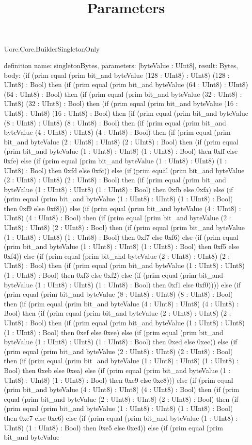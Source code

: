 \begin{lexlean}{Uorc.Core.BuilderSingletonOnly}
\title{Parameters}
\begin{semanticmodule}
definition{
  name: singletonBytes,
  parameters: [byteValue : UInt8],
  result: Bytes,
  body: (if (prim equal (prim bit_and byteValue (128 : UInt8) : UInt8) (128 : UInt8) : Bool) then (if (prim equal (prim bit_and byteValue (64 : UInt8) : UInt8) (64 : UInt8) : Bool) then (if (prim equal (prim bit_and byteValue (32 : UInt8) : UInt8) (32 : UInt8) : Bool) then (if (prim equal (prim bit_and byteValue (16 : UInt8) : UInt8) (16 : UInt8) : Bool) then (if (prim equal (prim bit_and byteValue (8 : UInt8) : UInt8) (8 : UInt8) : Bool) then (if (prim equal (prim bit_and byteValue (4 : UInt8) : UInt8) (4 : UInt8) : Bool) then (if (prim equal (prim bit_and byteValue (2 : UInt8) : UInt8) (2 : UInt8) : Bool) then (if (prim equal (prim bit_and byteValue (1 : UInt8) : UInt8) (1 : UInt8) : Bool) then 0xff else 0xfe) else (if (prim equal (prim bit_and byteValue (1 : UInt8) : UInt8) (1 : UInt8) : Bool) then 0xfd else 0xfc)) else (if (prim equal (prim bit_and byteValue (2 : UInt8) : UInt8) (2 : UInt8) : Bool) then (if (prim equal (prim bit_and byteValue (1 : UInt8) : UInt8) (1 : UInt8) : Bool) then 0xfb else 0xfa) else (if (prim equal (prim bit_and byteValue (1 : UInt8) : UInt8) (1 : UInt8) : Bool) then 0xf9 else 0xf8))) else (if (prim equal (prim bit_and byteValue (4 : UInt8) : UInt8) (4 : UInt8) : Bool) then (if (prim equal (prim bit_and byteValue (2 : UInt8) : UInt8) (2 : UInt8) : Bool) then (if (prim equal (prim bit_and byteValue (1 : UInt8) : UInt8) (1 : UInt8) : Bool) then 0xf7 else 0xf6) else (if (prim equal (prim bit_and byteValue (1 : UInt8) : UInt8) (1 : UInt8) : Bool) then 0xf5 else 0xf4)) else (if (prim equal (prim bit_and byteValue (2 : UInt8) : UInt8) (2 : UInt8) : Bool) then (if (prim equal (prim bit_and byteValue (1 : UInt8) : UInt8) (1 : UInt8) : Bool) then 0xf3 else 0xf2) else (if (prim equal (prim bit_and byteValue (1 : UInt8) : UInt8) (1 : UInt8) : Bool) then 0xf1 else 0xf0)))) else (if (prim equal (prim bit_and byteValue (8 : UInt8) : UInt8) (8 : UInt8) : Bool) then (if (prim equal (prim bit_and byteValue (4 : UInt8) : UInt8) (4 : UInt8) : Bool) then (if (prim equal (prim bit_and byteValue (2 : UInt8) : UInt8) (2 : UInt8) : Bool) then (if (prim equal (prim bit_and byteValue (1 : UInt8) : UInt8) (1 : UInt8) : Bool) then 0xef else 0xee) else (if (prim equal (prim bit_and byteValue (1 : UInt8) : UInt8) (1 : UInt8) : Bool) then 0xed else 0xec)) else (if (prim equal (prim bit_and byteValue (2 : UInt8) : UInt8) (2 : UInt8) : Bool) then (if (prim equal (prim bit_and byteValue (1 : UInt8) : UInt8) (1 : UInt8) : Bool) then 0xeb else 0xea) else (if (prim equal (prim bit_and byteValue (1 : UInt8) : UInt8) (1 : UInt8) : Bool) then 0xe9 else 0xe8))) else (if (prim equal (prim bit_and byteValue (4 : UInt8) : UInt8) (4 : UInt8) : Bool) then (if (prim equal (prim bit_and byteValue (2 : UInt8) : UInt8) (2 : UInt8) : Bool) then (if (prim equal (prim bit_and byteValue (1 : UInt8) : UInt8) (1 : UInt8) : Bool) then 0xe7 else 0xe6) else (if (prim equal (prim bit_and byteValue (1 : UInt8) : UInt8) (1 : UInt8) : Bool) then 0xe5 else 0xe4)) else (if (prim equal (prim bit_and byteValue }
\end{semanticmodule}
\end{lexlean}
